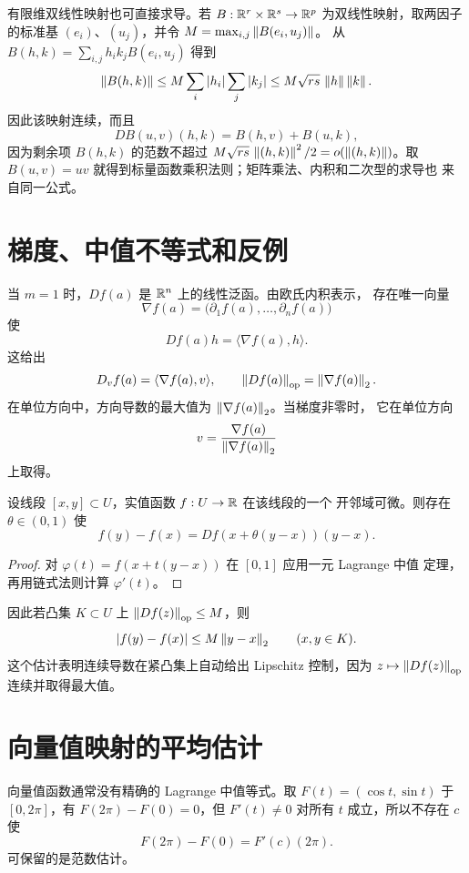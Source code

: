 有限维双线性映射也可直接求导。若
\(B:\mathbb{R}^r\times\mathbb{R}^s\to\mathbb{R}^p\) 为双线性映射，取两因子的标准基
\((e_i)\)、\((u_j)\)，并令 \(M=\max_{i,j}\left\lVert B(e_i,u_j)\right\rVert\)。
从 \(B(h,k)=\sum_{i,j}h_i k_j B(e_i,u_j)\) 得到
\[
 \left\lVert B(h,k)\right\rVert\le M\sum_i|h_i|\sum_j|k_j|
 \le M\sqrt{rs}\,\left\lVert h\right\rVert\left\lVert k\right\rVert.
\]
因此该映射连续，而且
\[
 DB(u,v)(h,k)=B(h,v)+B(u,k),
\]
因为剩余项 \(B(h,k)\) 的范数不超过
\(M\sqrt{rs}\,\left\lVert(h,k)\right\rVert^2/2=o(\left\lVert(h,k)\right\rVert)\)。取
\(B(u,v)=uv\) 就得到标量函数乘积法则；矩阵乘法、内积和二次型的求导也
来自同一公式。

\section{梯度、中值不等式和反例}

当 \(m=1\) 时，\(Df(a)\) 是 \(\mathbb{R}^n\) 上的线性泛函。由欧氏内积表示，
存在唯一向量
\[
 \nabla f(a)=\bigl(\partial_1f(a),\ldots,\partial_nf(a)\bigr)
\]
使
\[
 Df(a)h=\langle\nabla f(a),h\rangle.
\]
这给出
\[
 D_vf(a)=\langle\nabla f(a),v\rangle,
 \qquad
 \left\lVert Df(a)\right\rVert_{\mathrm{op}}=\left\lVert\nabla f(a)\right\rVert_2.
\]
在单位方向中，方向导数的最大值为 $\left\lVert\nabla f(a)\right\rVert_2$。当梯度非零时，
它在单位方向
\[
 v=\frac{\nabla f(a)}{\left\lVert\nabla f(a)\right\rVert_2}
\]
上取得。

\begin{theorem}[标量中值定理]
\label{thm:scalar-segment-mean-value}
设线段 \([x,y]\subset U\)，实值函数 \(f:U\to\mathbb{R}\) 在该线段的一个
开邻域可微。则存在 \(\theta\in(0,1)\) 使
\[
 f(y)-f(x)=Df(x+\theta(y-x))(y-x).
\]
\end{theorem}

\begin{proof}
对 \(\varphi(t)=f(x+t(y-x))\) 在 \([0,1]\) 应用一元 Lagrange 中值
定理，再用链式法则计算 \(\varphi'(t)\)。
\end{proof}

因此若凸集 \(K\subset U\) 上
\(\left\lVert Df(z)\right\rVert_{\mathrm{op}}\le M\)，则
\[
 |f(y)-f(x)|\le M\left\lVert y-x\right\rVert_2\qquad(x,y\in K).
\]
这个估计表明连续导数在紧凸集上自动给出 Lipschitz 控制，因为
\(z\mapsto\left\lVert Df(z)\right\rVert_{\mathrm{op}}\) 连续并取得最大值。

\section{向量值映射的平均估计}

向量值函数通常没有精确的 Lagrange 中值等式。取
\(F(t)=(\cos t,\sin t)\) 于 \([0,2\pi]\)，有
\(F(2\pi)-F(0)=0\)，但 \(F'(t)\ne0\) 对所有 \(t\) 成立，所以不存在
\(c\) 使
\[
 F(2\pi)-F(0)=F'(c)(2\pi).
\]
可保留的是范数估计。

